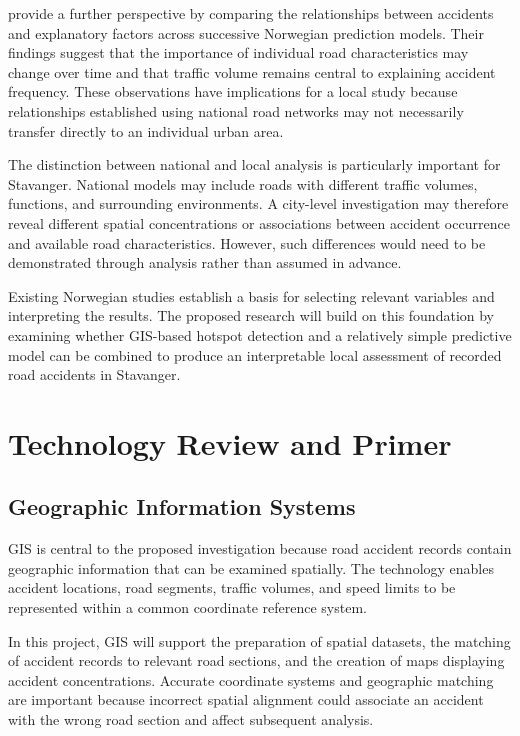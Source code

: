 \textcite{ElvikHoye2023} provide a further perspective by comparing the relationships between accidents and explanatory factors across successive Norwegian prediction models. Their findings suggest that the importance of individual road characteristics may change over time and that traffic volume remains central to explaining accident frequency. These observations have implications for a local study because relationships established using national road networks may not necessarily transfer directly to an individual urban area.

The distinction between national and local analysis is particularly important for Stavanger. National models may include roads with different traffic volumes, functions, and surrounding environments. A city-level investigation may therefore reveal different spatial concentrations or associations between accident occurrence and available road characteristics. However, such differences would need to be demonstrated through analysis rather than assumed in advance.

Existing Norwegian studies establish a basis for selecting relevant variables and interpreting the results. The proposed research will build on this foundation by examining whether GIS-based hotspot detection and a relatively simple predictive model can be combined to produce an interpretable local assessment of recorded road accidents in Stavanger. 

\section{Technology Review and Primer}
\label{sec:lit-technologies}
\subsection{Geographic Information Systems}
\label{subsec:lit-gis}
GIS is central to the proposed investigation because road accident records contain geographic information that can be examined spatially. The technology enables accident locations, road segments, traffic volumes, and speed limits to be represented within a common coordinate reference system.

In this project, GIS will support the preparation of spatial datasets, the matching of accident records to relevant road sections, and the creation of maps displaying accident concentrations. Accurate coordinate systems and geographic matching are important because incorrect spatial alignment could associate an accident with the wrong road section and affect subsequent analysis.


